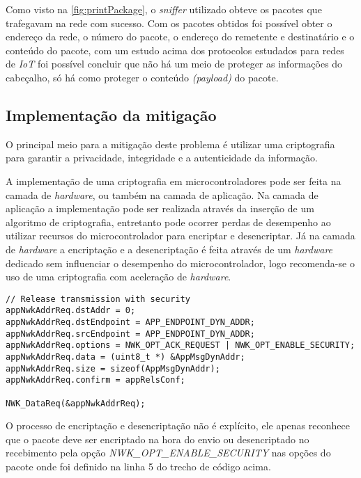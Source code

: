 \par Como visto na \autoref{fig:printPackage}, o \emph{sniffer} utilizado obteve os pacotes que trafegavam na rede com sucesso. Com os pacotes obtidos foi possível obter o endereço da rede, o número do pacote, o endereço do remetente e destinatário e o conteúdo do pacote, com um estudo acima dos protocolos estudados para redes de \emph{IoT} foi poss\'ivel concluir que n\~ao h\'a um meio de proteger as informa\c{c}\~oes do cabe\c{c}alho, s\'o h\'a como proteger o conte\'udo \emph{(payload)} do pacote.

\subsection{Implementação da mitigação}
\par O principal meio para a mitiga\c{c}\~ao deste problema \'e utilizar uma criptografia para garantir a privacidade, integridade e a autenticidade da informa\c{c}\~ao.

\par A implementa\c{c}\~ao de uma criptografia em microcontroladores pode ser feita na camada de \emph{hardware}, ou tamb\'em na camada de aplica\c{c}\~ao. Na camada de aplica\c{c}\~ao a implementa\c{c}\~ao pode ser realizada atrav\'es da inser\c{c}\~ao de um algoritmo de criptografia, entretanto pode ocorrer perdas de desempenho ao utilizar recursos do microcontrolador para encriptar e desencriptar. J\'a na camada de \emph{hardware} a encripta\c{c}\~ao e a desencripta\c{c}\~ao \'e feita atrav\'es de um \emph{hardware} dedicado sem influenciar o desempenho do microcontrolador, logo recomenda-se o uso de uma criptografia com acelera\c{c}\~ao de \emph{hardware}.

\begin{lstlisting}[label={lst:packet}]
// Release transmission with security
appNwkAddrReq.dstAddr = 0;
appNwkAddrReq.dstEndpoint = APP_ENDPOINT_DYN_ADDR;
appNwkAddrReq.srcEndpoint = APP_ENDPOINT_DYN_ADDR;
appNwkAddrReq.options = NWK_OPT_ACK_REQUEST | NWK_OPT_ENABLE_SECURITY;
appNwkAddrReq.data = (uint8_t *) &AppMsgDynAddr;
appNwkAddrReq.size = sizeof(AppMsgDynAddr);
appNwkAddrReq.confirm = appRelsConf;

NWK_DataReq(&appNwkAddrReq);
\end{lstlisting}

\par O processo de encriptação e desencriptação não é explícito, ele apenas reconhece que o pacote deve ser encriptado na hora do envio ou desencriptado no recebimento pela opção \emph{NWK\_OPT\_ENABLE\_SECURITY} nas opções do pacote onde foi definido na linha 5 do trecho de c\'odigo acima.


